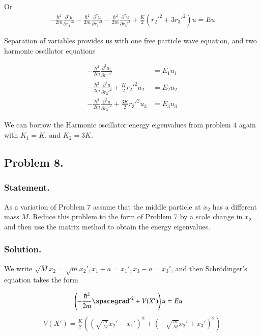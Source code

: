 Or
\begin{align}\label{eqn:desaiCh9:708b}
-\frac{\hbar^2}{2m} \frac{\partial^2 u}{\partial {r_1'}^2}
-\frac{\hbar^2}{2m} \frac{\partial^2 u}{\partial {r_2'}^2}
-\frac{\hbar^2}{2m} \frac{\partial^2 u}{\partial {r_3'}^2}
+ \frac{K}{2}
\left(
{r_2'}^2
+3 {r_3'}^2
\right) u
= E u
\end{align}

Separation of variables provides us with one free particle wave equation, and two harmonic oscillator equations

\begin{align}\label{eqn:desaiCh9:708c}
-\frac{\hbar^2}{2m} \frac{\partial^2 u_1}{\partial {r_1'}^2} &= E_1 u_1 \\
-\frac{\hbar^2}{2m} \frac{\partial^2 u}{\partial {r_2'}^2} + \frac{K}{2} {r_2'}^2 u_2 &= E_2 u_2 \\
-\frac{\hbar^2}{2m} \frac{\partial^2 u}{\partial {r_3'}^2} + \frac{3 K}{2} {r_3'}^2 u_3 &= E_3 u_3
\end{align}

We can borrow the Harmonic oscillator energy eigenvalues from problem 4 again with $K_1 = K$, and $K_2 = 3 K$.

\subsection{Problem 8.}
\subsubsection{Statement.}

As a variation of Problem 7 assume that the middle particle at $x_2$ has a different mass $M$.  Reduce this problem to the form of Problem 7 by a scale change in $x_2$ and then use the matrix method to obtain the energy eigenvalues.

\subsubsection{Solution.}

We write $\sqrt{M} x_2 = \sqrt{m} x_2', x_1 + a = x_1', x_3 - a = x_3'$, and then  Schr\"{o}dinger's equation takes the form

\begin{align}\label{eqn:desaiCh9:800}
\left( -\frac{\hbar^2}{2m} {\spacegrad'}^2 + V(X') \right) u &= E u 
\end{align}
\begin{align}\label{eqn:desaiCh9:801}
V(X') = \frac{K}{2} 
\left( 
\left( \sqrt{\frac{m}{M}} x_2' - x_1' 
\right)^2
+\left( -\sqrt{\frac{m}{M}} x_2' + x_3' 
\right)^2
\right)
\end{align}

